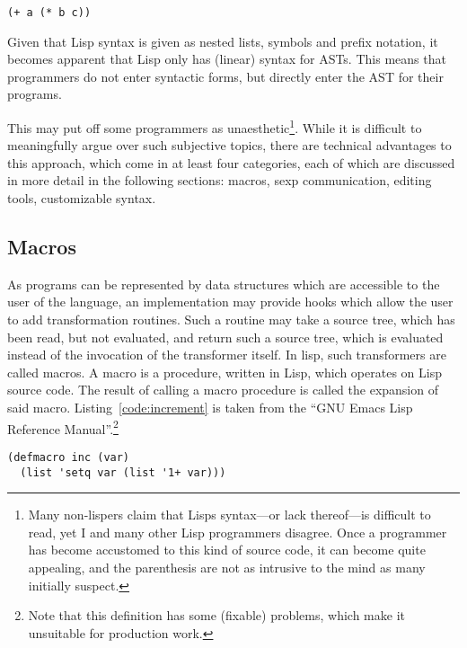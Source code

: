 \documentclass[a4paper,10pt,twoside]{report}
\begin{document}

\begin{lstlisting}[style=lispinline]
(+ a (* b c))
\end{lstlisting}

Given that Lisp syntax is given as nested lists, symbols and prefix notation, it
becomes apparent that Lisp only has (linear) syntax for ASTs.  This means that
programmers do not enter syntactic forms, but directly enter the AST for their
programs.

This may put off some programmers as unaesthetic\footnote{Many non-lispers claim
  that Lisps syntax---or lack thereof---is difficult to read, yet I and many
  other Lisp programmers disagree.  Once a programmer has become accustomed to
  this kind of source code, it can become quite appealing, and the parenthesis
  are not as intrusive to the mind as many initially suspect.}.  While it is
difficult to meaningfully argue over such subjective topics, there are technical
advantages to this approach, which come in at least four categories, each of
which are discussed in more detail in the following sections: macros, sexp
communication, editing tools, customizable syntax.

\subsection{Macros}
\label{subsec:macros}

As programs can be represented by data structures which are accessible to the
user of the language, an implementation may provide hooks which allow the user
to add transformation routines.  Such a routine may take a source tree, which
has been read, but not evaluated, and return such a source tree, which is
evaluated instead of the invocation of the transformer itself.  In lisp, such
transformers are called macros.  A macro is a procedure, written in Lisp, which
operates on Lisp source code.  The result of calling a macro procedure is called
the expansion of said macro.  Listing~\ref{code:increment} is taken from the
``GNU Emacs Lisp Reference Manual''.\footnote{Note that this definition has some
  (fixable) problems, which make it unsuitable for production work.}

\pagebreak

\begin{lstlisting}[style=lispcode,caption={Increment as a
      macro.},label={code:increment}]
(defmacro inc (var)
  (list 'setq var (list '1+ var)))
\end{lstlisting}
\end{document}
